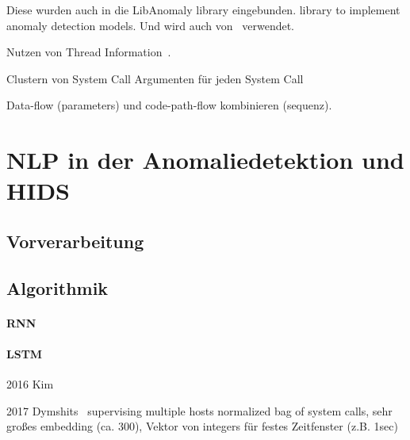         Diese wurden auch in die LibAnomaly library eingebunden. library to implement anomaly detection models.
        Und wird auch von~\cite{MAGGI} verwendet.

        Nutzen von Thread Information~\cite{IDSTHREADGRIMMER2021}.

        Clustern von System Call Argumenten für jeden System Call~\cite{}

        Data-flow (parameters) und code-path-flow kombinieren (sequenz).


\section{NLP in der Anomaliedetektion und HIDS}

    \subsection{Vorverarbeitung}

    \subsection{Algorithmik}

        \paragraph{RNN}

        \paragraph{LSTM}

        2016 Kim~\cite{LSTMsys} 

        2017 Dymshits~\cite{LSTMDYMSHITS2017} supervising multiple hosts
        normalized bag of system calls, sehr großes embedding (ca. 300), Vektor von integers für festes Zeitfenster (z.B. 1sec)



